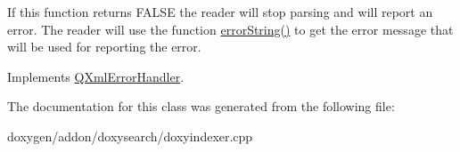 If this function returns F\+A\+L\+SE the reader will stop parsing and will report an error. The reader will use the function \mbox{\hyperlink{class_x_m_l_error_handler_ac8884161fa6aa0624f42ec57b04a66bb}{error\+String()}} to get the error message that will be used for reporting the error. 

Implements \mbox{\hyperlink{class_q_xml_error_handler_a79ae0cce3316a76b7777c6e90b101afe}{Q\+Xml\+Error\+Handler}}.



The documentation for this class was generated from the following file\+:\begin{DoxyCompactItemize}
\item 
doxygen/addon/doxysearch/doxyindexer.\+cpp\end{DoxyCompactItemize}
